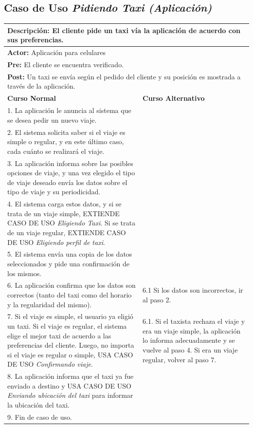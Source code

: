 \documentclass[a4paper]{article}
\begin{document}
\subsection{Caso de Uso \textit{Pidiendo Taxi (Aplicaci\'on)}}
\begin{center}
\begin{tabular}{|p{10cm} | p{6cm}|}
\hline
\multicolumn{2}{|p{15cm}|}{\textbf{Descripci\'on:} El cliente pide un taxi v\'ia la aplicaci\'on de acuerdo con sus preferencias. } \\
\hline
\multicolumn{2}{|p{15cm}|}{\textbf{Actor:} Aplicaci\'on para celulares } \\
\hline
\multicolumn{2}{|p{15cm}|}{\textbf{Pre:} El cliente se encuentra verificado. } \\
\hline
\multicolumn{2}{|p{15cm}|}{\textbf{Post:} Un taxi se env\'ia seg\'un el pedido del cliente y su posici\'on es mostrada a trav\'es de la aplicaci\'on. }\\
\hline
\textbf{Curso Normal}  & \textbf{Curso Alternativo} \\ \hline
1. La aplicaci\'on le anuncia al sistema que se desea pedir un nuevo viaje. & \\ \hline
2. El sistema solicita saber si el viaje es simple o regular, y en este \'ultimo caso, cada cu\'anto se realizar\'a el viaje. & \\ \hline
3. La aplicaci\'on informa sobre las posibles opciones de viaje, y una vez elegido el tipo de viaje deseado env\'ia los datos sobre el tipo de viaje y su periodicidad. & \\ \hline
4. El sistema carga estos datos, y si se trata de un viaje simple, EXTIENDE CASO DE USO \textit{Eligiendo Taxi}. Si se trata de un viaje regular, EXTIENDE CASO DE USO \textit{Eligiendo perfil de taxi}. & \\ \hline
5. El sistema env\'ia una copia de los datos seleccionados y pide una confirmaci\'on de los mismos. & \\ \hline
6. La aplicaci\'on confirma que los datos son correctos (tanto del taxi como del horario y la regularidad del mismo). & 6.1 Si los datos son incorrectos, ir al paso 2. \\ \hline
7. Si el viaje es simple, el usuario ya eligi\'o un taxi. Si el viaje es regular, el sistema elige el mejor taxi de acuerdo a las preferencias del cliente. Luego, no importa si el viaje es regular o simple, USA CASO DE USO \textit{Confirmando viaje}. & 6.1. Si el taxista rechaza el viaje y era un viaje simple, la aplicaci\'on lo informa adecuadamente y se vuelve al paso 4. Si era un viaje regular, volver al paso 7. \\ \hline
8. La aplicaci\'on informa que el taxi ya fue enviado a destino y USA CASO DE USO \textit{Enviando ubicaci\'on del taxi} para informar la ubicaci\'on del taxi. & \\ \hline
9. Fin de caso de uso. & \\ \hline
\end{tabular}
\end{center}
\end{document}
